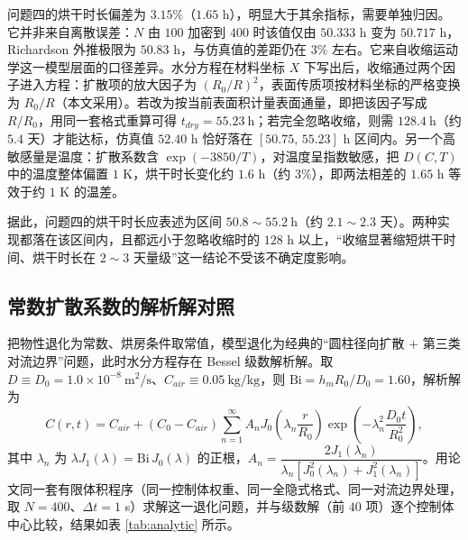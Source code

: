 \documentclass[12pt,a4paper]{article}
\begin{document}
\begin{center}
问题四的烘干时长偏差为 $3.15\%$（$1.65$ h），明显大于其余指标，需要单独归因。它并非来自离散误差：$N$ 由 $100$ 加密到 $400$ 时该值仅由 $50.333$ h 变为 $50.717$ h，Richardson 外推极限为 $50.83$ h，与仿真值的差距仍在 $3\%$ 左右。它来自收缩运动学这一模型层面的口径差异。水分方程在材料坐标 $X$ 下写出后，收缩通过两个因子进入方程：扩散项的放大因子为 $(R_0/R)^2$，表面传质项按材料坐标的严格变换为 $R_0/R$（本文采用）。若改为按当前表面积计量表面通量，即把该因子写成 $R/R_0$，用同一套格式重算可得 $t_{dry}=55.23\ \mathrm{h}$；若完全忽略收缩，则需 $128.4\ \mathrm{h}$（约 $5.4$ 天）才能达标，仿真值 $52.40$ h 恰好落在 $[50.75,\,55.23]$ h 区间内。另一个高敏感量是温度：扩散系数含 $\exp(-3850/T)$，对温度呈指数敏感，把 $D(C,T)$ 中的温度整体偏置 $1$ K，烘干时长变化约 $1.6$ h（约 $3\%$），即两法相差的 $1.65$ h 等效于约 $1$ K 的温差。

据此，问题四的烘干时长应表述为区间 $50.8\sim55.2\ \mathrm{h}$（约 $2.1\sim2.3$ 天）。两种实现都落在该区间内，且都远小于忽略收缩时的 $128$ h 以上，“收缩显著缩短烘干时间、烘干时长在 $2\sim3$ 天量级”这一结论不受该不确定度影响。

\subsection{常数扩散系数的解析解对照}
\label{sec:analytic}

把物性退化为常数、烘房条件取常值，模型退化为经典的“圆柱径向扩散 $+$ 第三类对流边界”问题，此时水分方程存在 Bessel 级数解析解。取 $D\equiv D_0=1.0\times10^{-8}\ \mathrm{m^2/s}$、$C_{air}\equiv0.05\ \mathrm{kg/kg}$，则 $\mathrm{Bi}=h_mR_0/D_0=1.60$，解析解为
\begin{equation}
C(r,t)=C_{air}+\left(C_0-C_{air}\right)\sum_{n=1}^{\infty}A_nJ_0\!\left(\lambda_n\frac{r}{R_0}\right)\exp\!\left(-\lambda_n^{2}\frac{D_0t}{R_0^{2}}\right),
\end{equation}
其中 $\lambda_n$ 为 $\lambda J_1(\lambda)=\mathrm{Bi}\,J_0(\lambda)$ 的正根，$A_n=\dfrac{2J_1(\lambda_n)}{\lambda_n\left[J_0^{2}(\lambda_n)+J_1^{2}(\lambda_n)\right]}$。用论文同一套有限体积程序（同一控制体权重、同一全隐式格式、同一对流边界处理，取 $N=400$、$\Delta t=1$ s）求解这一退化问题，并与级数解（前 $40$ 项）逐个控制体中心比较，结果如表 \ref{tab:analytic} 所示。


\end{center}
\end{document}
